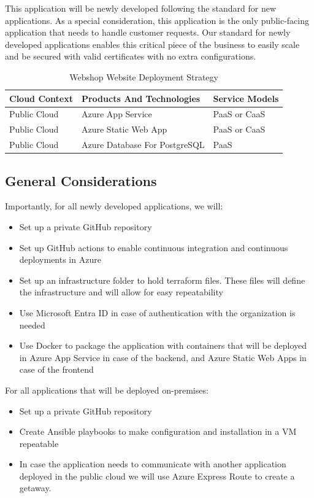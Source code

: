 \documentclass{llncs}
\begin{document}
This application will be newly developed following the standard for new applications.
As a special consideration, this application is the only public-facing application that needs to handle customer requests.
Our standard for newly developed applications enables this critical piece of the business to easily scale and be secured with valid certificates with no extra configurations.\\

\begin{table}[h!]
    \centering
    \begin{tabular}{lll}
        \hline
        \textbf{Cloud Context} & \textbf{Products And Technologies} & \textbf{Service Models} \\
        \hline
 Public Cloud           & Azure App Service                  & PaaS or CaaS            \\
        \hline
 Public Cloud           & Azure Static Web App               & PaaS or CaaS            \\
        \hline
 Public Cloud           & Azure Database For PostgreSQL      & PaaS                    \\
        \hline
    \end{tabular}
    \caption{Webshop Website Deployment Strategy}
\end{table}

\subsection{General Considerations}

Importantly, for all newly developed applications, we will:
\begin{itemize}
    \item Set up a private GitHub repository
    \item Set up GitHub actions to enable continuous integration and continuous deployments in Azure
    \item Set up an infrastructure folder to hold terraform files. These files will define the infrastructure and will allow for easy repeatability
    \item Use Microsoft Entra ID in case of authentication with the organization is needed
    \item Use Docker to package the application with containers that will be deployed in Azure App Service in case of the backend, and Azure Static Web Apps in case of the frontend
\end{itemize}
For all applications that will be deployed on-premises:
\begin{itemize}
    \item Set up a private GitHub repository
    \item Create Ansible playbooks to make configuration and installation in a VM repeatable
    \item In case the application needs to communicate with another application deployed in the public cloud we will use Azure Express Route to create a getaway.
\end{itemize}
\end{document}
